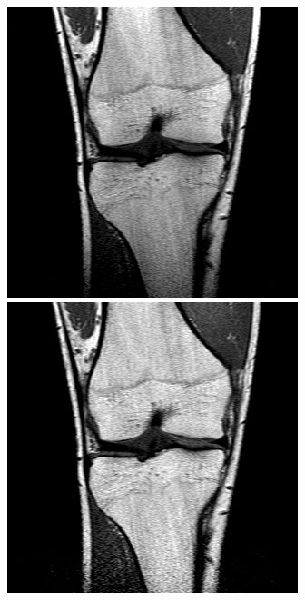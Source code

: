 \begin{figure}[H]
  \includegraphics[width=\linewidth]{imgs/orig.jpg}
\endminipage\hfill
{}
  \includegraphics[width=\linewidth]{imgs/corr.jpg}

\end{figure}
